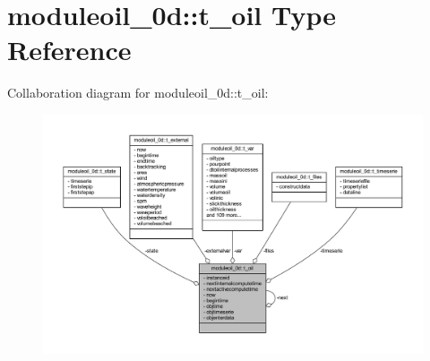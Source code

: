 \hypertarget{structmoduleoil__0d_1_1t__oil}{}\section{moduleoil\+\_\+0d\+:\+:t\+\_\+oil Type Reference}
\label{structmoduleoil__0d_1_1t__oil}


Collaboration diagram for moduleoil\+\_\+0d\+:\+:t\+\_\+oil\+:\nopagebreak
\begin{figure}[H]
\begin{center}
\leavevmode
\includegraphics[width=350pt]{structmoduleoil__0d_1_1t__oil__coll__graph}
\end{center}
\end{figure}
